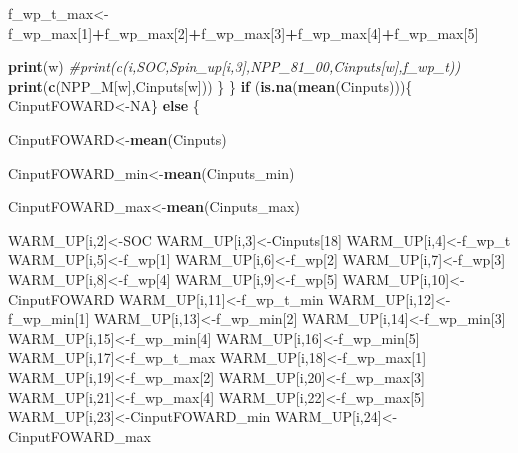 \documentclass[
  10pt,
  b5paper,
]{book}
\newenvironment{Shaded}{\begin{snugshade}}{\end{snugshade}}
\newcommand{\CommentTok}[1]{\textcolor[rgb]{0.56,0.35,0.01}{\textit{#1}}}
\newcommand{\ControlFlowTok}[1]{\textcolor[rgb]{0.13,0.29,0.53}{\textbf{#1}}}
\newcommand{\DecValTok}[1]{\textcolor[rgb]{0.00,0.00,0.81}{#1}}
\newcommand{\KeywordTok}[1]{\textcolor[rgb]{0.13,0.29,0.53}{\textbf{#1}}}
\newcommand{\NormalTok}[1]{#1}
\newcommand{\OperatorTok}[1]{\textcolor[rgb]{0.81,0.36,0.00}{\textbf{#1}}}
\newcommand{\OtherTok}[1]{\textcolor[rgb]{0.56,0.35,0.01}{#1}}
\begin{document}
\begin{Shaded}
\begin{Highlighting}[]
{\NormalTok{f_wp_t_max<-f_wp_max[}\DecValTok{1}\NormalTok{]}\OperatorTok{+}\NormalTok{f_wp_max[}\DecValTok{2}\NormalTok{]}\OperatorTok{+}\NormalTok{f_wp_max[}\DecValTok{3}\NormalTok{]}\OperatorTok{+}\NormalTok{f_wp_max[}\DecValTok{4}\NormalTok{]}\OperatorTok{+}\NormalTok{f_wp_max[}\DecValTok{5}\NormalTok{]}

\KeywordTok{print}\NormalTok{(w)}
\CommentTok{#print(c(i,SOC,Spin_up[i,3],NPP_81_00,Cinputs[w],f_wp_t))}
\KeywordTok{print}\NormalTok{(}\KeywordTok{c}\NormalTok{(NPP_M[w],Cinputs[w]))}
\NormalTok{\}}
\NormalTok{\}}
\ControlFlowTok{if}\NormalTok{ (}\KeywordTok{is.na}\NormalTok{(}\KeywordTok{mean}\NormalTok{(Cinputs)))\{ CinputFOWARD<-}\OtherTok{NA}\NormalTok{\} }\ControlFlowTok{else}\NormalTok{ \{ }

\NormalTok{CinputFOWARD<-}\KeywordTok{mean}\NormalTok{(Cinputs)}

\NormalTok{CinputFOWARD_min<-}\KeywordTok{mean}\NormalTok{(Cinputs_min)}

\NormalTok{CinputFOWARD_max<-}\KeywordTok{mean}\NormalTok{(Cinputs_max)}

\NormalTok{WARM_UP[i,}\DecValTok{2}\NormalTok{]<-SOC}
\NormalTok{WARM_UP[i,}\DecValTok{3}\NormalTok{]<-Cinputs[}\DecValTok{18}\NormalTok{]}
\NormalTok{WARM_UP[i,}\DecValTok{4}\NormalTok{]<-f_wp_t}
\NormalTok{WARM_UP[i,}\DecValTok{5}\NormalTok{]<-f_wp[}\DecValTok{1}\NormalTok{]}
\NormalTok{WARM_UP[i,}\DecValTok{6}\NormalTok{]<-f_wp[}\DecValTok{2}\NormalTok{]}
\NormalTok{WARM_UP[i,}\DecValTok{7}\NormalTok{]<-f_wp[}\DecValTok{3}\NormalTok{]}
\NormalTok{WARM_UP[i,}\DecValTok{8}\NormalTok{]<-f_wp[}\DecValTok{4}\NormalTok{]}
\NormalTok{WARM_UP[i,}\DecValTok{9}\NormalTok{]<-f_wp[}\DecValTok{5}\NormalTok{]}
\NormalTok{WARM_UP[i,}\DecValTok{10}\NormalTok{]<-CinputFOWARD}
\NormalTok{WARM_UP[i,}\DecValTok{11}\NormalTok{]<-f_wp_t_min}
\NormalTok{WARM_UP[i,}\DecValTok{12}\NormalTok{]<-f_wp_min[}\DecValTok{1}\NormalTok{]}
\NormalTok{WARM_UP[i,}\DecValTok{13}\NormalTok{]<-f_wp_min[}\DecValTok{2}\NormalTok{]}
\NormalTok{WARM_UP[i,}\DecValTok{14}\NormalTok{]<-f_wp_min[}\DecValTok{3}\NormalTok{]}
\NormalTok{WARM_UP[i,}\DecValTok{15}\NormalTok{]<-f_wp_min[}\DecValTok{4}\NormalTok{]}
\NormalTok{WARM_UP[i,}\DecValTok{16}\NormalTok{]<-f_wp_min[}\DecValTok{5}\NormalTok{]}
\NormalTok{WARM_UP[i,}\DecValTok{17}\NormalTok{]<-f_wp_t_max}
\NormalTok{WARM_UP[i,}\DecValTok{18}\NormalTok{]<-f_wp_max[}\DecValTok{1}\NormalTok{]}
\NormalTok{WARM_UP[i,}\DecValTok{19}\NormalTok{]<-f_wp_max[}\DecValTok{2}\NormalTok{]}
\NormalTok{WARM_UP[i,}\DecValTok{20}\NormalTok{]<-f_wp_max[}\DecValTok{3}\NormalTok{]}
\NormalTok{WARM_UP[i,}\DecValTok{21}\NormalTok{]<-f_wp_max[}\DecValTok{4}\NormalTok{]}
\NormalTok{WARM_UP[i,}\DecValTok{22}\NormalTok{]<-f_wp_max[}\DecValTok{5}\NormalTok{]}
\NormalTok{WARM_UP[i,}\DecValTok{23}\NormalTok{]<-CinputFOWARD_min}
\NormalTok{WARM_UP[i,}\DecValTok{24}\NormalTok{]<-CinputFOWARD_max}

}
\end{Highlighting}
\end{Shaded}
\end{document}
